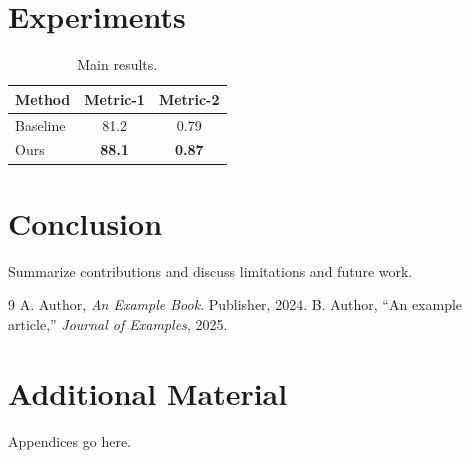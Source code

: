 \documentclass[12pt, oneside]{book}
\begin{document}
\chapter{Experiments}
\begin{table}[h]
  \centering
  \caption{Main results.}
  \begin{tabular}{lcc}
    \toprule
    Method & Metric-1 & Metric-2 \\
    \midrule
    Baseline & 81.2 & 0.79 \\
    Ours     & \textbf{88.1} & \textbf{0.87} \\
    \bottomrule
  \end{tabular}
\end{table}

\chapter{Conclusion}
Summarize contributions and discuss limitations and future work.

\backmatter
\begin{thebibliography}{9}
 A. Author, \emph{An Example Book}. Publisher, 2024.
 B. Author, ``An example article,'' \emph{Journal of Examples}, 2025.
\end{thebibliography}

\appendix
\chapter{Additional Material}
Appendices go here.
\end{document}
